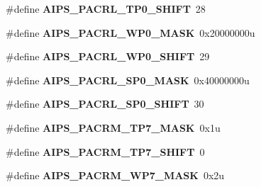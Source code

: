 \begin{DoxyCompactItemize}
\item 
\#define {\bfseries A\+I\+P\+S\+\_\+\+P\+A\+C\+R\+L\+\_\+\+T\+P0\+\_\+\+S\+H\+I\+FT}~28\hypertarget{group__AIPS__Register__Masks_gad4ee7c9015ca3ce0a1af0e5e6eb68cf6}{}\label{group__AIPS__Register__Masks_gad4ee7c9015ca3ce0a1af0e5e6eb68cf6}

\item 
\#define {\bfseries A\+I\+P\+S\+\_\+\+P\+A\+C\+R\+L\+\_\+\+W\+P0\+\_\+\+M\+A\+SK}~0x20000000u\hypertarget{group__AIPS__Register__Masks_ga2d38d55a84ecc02f53d03af165de462d}{}\label{group__AIPS__Register__Masks_ga2d38d55a84ecc02f53d03af165de462d}

\item 
\#define {\bfseries A\+I\+P\+S\+\_\+\+P\+A\+C\+R\+L\+\_\+\+W\+P0\+\_\+\+S\+H\+I\+FT}~29\hypertarget{group__AIPS__Register__Masks_gad463bdb994530b66aa510e16b99666b5}{}\label{group__AIPS__Register__Masks_gad463bdb994530b66aa510e16b99666b5}

\item 
\#define {\bfseries A\+I\+P\+S\+\_\+\+P\+A\+C\+R\+L\+\_\+\+S\+P0\+\_\+\+M\+A\+SK}~0x40000000u\hypertarget{group__AIPS__Register__Masks_ga57d8e6c512f706b15c738de291de079b}{}\label{group__AIPS__Register__Masks_ga57d8e6c512f706b15c738de291de079b}

\item 
\#define {\bfseries A\+I\+P\+S\+\_\+\+P\+A\+C\+R\+L\+\_\+\+S\+P0\+\_\+\+S\+H\+I\+FT}~30\hypertarget{group__AIPS__Register__Masks_ga1fb5b6e8699d14ecbb8698c7e9c98c5b}{}\label{group__AIPS__Register__Masks_ga1fb5b6e8699d14ecbb8698c7e9c98c5b}

\item 
\#define {\bfseries A\+I\+P\+S\+\_\+\+P\+A\+C\+R\+M\+\_\+\+T\+P7\+\_\+\+M\+A\+SK}~0x1u\hypertarget{group__AIPS__Register__Masks_gab1b4268a6ecb331c6b993fa656528a47}{}\label{group__AIPS__Register__Masks_gab1b4268a6ecb331c6b993fa656528a47}

\item 
\#define {\bfseries A\+I\+P\+S\+\_\+\+P\+A\+C\+R\+M\+\_\+\+T\+P7\+\_\+\+S\+H\+I\+FT}~0\hypertarget{group__AIPS__Register__Masks_gaaf1538667d3a7ecbb44037b94f52ded1}{}\label{group__AIPS__Register__Masks_gaaf1538667d3a7ecbb44037b94f52ded1}

\item 
\#define {\bfseries A\+I\+P\+S\+\_\+\+P\+A\+C\+R\+M\+\_\+\+W\+P7\+\_\+\+M\+A\+SK}~0x2u\hypertarget{group__AIPS__Register__Masks_ga8ad034a32c127eaf97de2057ea979568}{}\label{group__AIPS__Register__Masks_ga8ad034a32c127eaf97de2057ea979568}


\end{DoxyCompactItemize}
